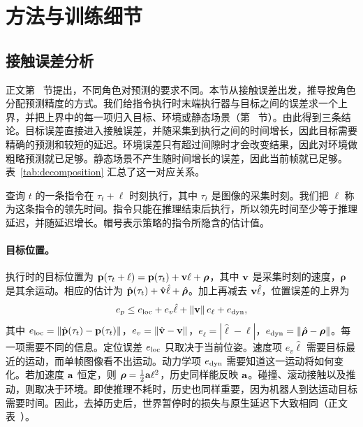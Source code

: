 \section{方法与训练细节}
\label{app:implementation}

\subsection{接触误差分析}
\label{app:decomposition}
正文第~ 节提出，不同角色对预测的要求不同。本节从接触误差出发，推导按角色分配预测精度的方式。我们给指令执行时末端执行器与目标之间的误差求一个上界，并把上界中的每一项归入目标、环境或静态场景（第~ 节）。由此得到三条结论。目标误差直接进入接触误差，并随采集到执行之间的时间增长，因此目标需要精确的预测和较短的延迟。环境误差只有超过间隙时才会改变结果，因此对环境做粗略预测就已足够。静态场景不产生随时间增长的误差，因此当前帧就已足够。表~\ref{tab:decomposition} 汇总了这一对应关系。

查询 $t$ 的一条指令在 $\tau_t+\ell$ 时刻执行，其中 $\tau_t$ 是图像的采集时刻。我们把 $\ell$ 称为这条指令的领先时间。指令只能在推理结束后执行，所以领先时间至少等于推理延迟，并随延迟增长。帽号表示策略的指令所隐含的估计值。

\paragraph{目标位置。}
执行时的目标位置为 $\mathbf{p}(\tau_t+\ell)=\mathbf{p}(\tau_t)+\mathbf{v}\ell+\boldsymbol\rho$，其中 $\mathbf{v}$ 是采集时刻的速度，$\boldsymbol\rho$ 是其余运动。相应的估计为 $\hat{\mathbf{p}}(\tau_t)+\hat{\mathbf{v}}\hat\ell+\hat{\boldsymbol\rho}$。加上再减去 $\mathbf{v}\hat\ell$，位置误差的上界为
\begin{equation}
e_p\le e_{\rm loc}+e_v\hat\ell+\|\mathbf{v}\|\,e_\ell+e_{\rm dyn},
\label{eq:budget_translation}
\end{equation}
其中 $e_{\rm loc}=\|\hat{\mathbf{p}}(\tau_t)-\mathbf{p}(\tau_t)\|$，$e_v=\|\hat{\mathbf{v}}-\mathbf{v}\|$，$e_\ell=|\hat\ell-\ell|$，$e_{\rm dyn}=\|\hat{\boldsymbol\rho}-\boldsymbol\rho\|$。每一项需要不同的信息。定位误差 $e_{\rm loc}$ 只取决于当前位姿。速度项 $e_v\hat\ell$ 需要目标最近的运动，而单帧图像看不出运动。动力学项 $e_{\rm dyn}$ 需要知道这一运动将如何变化。若加速度 $\mathbf{a}$ 恒定，则 $\boldsymbol\rho=\tfrac12\mathbf{a}\ell^2$，历史同样能反映 $\mathbf{a}$。碰撞、滚动接触以及推动，则取决于环境。即使推理不耗时，历史也同样重要，因为机器人到达运动目标需要时间。因此，去掉历史后，世界暂停时的损失与原生延迟下大致相同（正文表~）。

